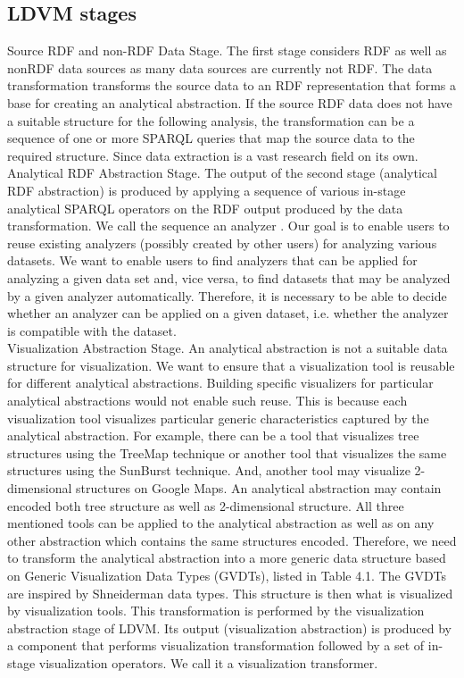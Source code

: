 \documentclass[a4paper,12pt,oneside]{report}
\begin{document}
{{\subsection{LDVM stages}
{Source RDF and non-RDF Data Stage. The first stage considers RDF as well as nonRDF data sources as many data sources are currently not RDF. The data transformation transforms the source data to an RDF representation that forms a base for creating an
analytical abstraction. If the source RDF data does not have a suitable structure for the following analysis, the transformation can be a sequence of one or more SPARQL queries that map the source data to the required structure. Since data extraction is a vast research field on its own.\\
Analytical RDF Abstraction Stage. The output of the second stage (analytical RDF abstraction) is produced by applying a sequence of various in-stage analytical SPARQL
operators on the RDF output produced by the data transformation. We call the sequence an analyzer . Our goal is to enable users to reuse existing analyzers (possibly created by other users) for analyzing various datasets. We want to enable users
to find analyzers that can be applied for analyzing a given data set and, vice versa, to find datasets that may be analyzed by a given analyzer automatically. Therefore, it is necessary to be able to decide whether an analyzer can be applied on a given dataset, i.e. whether the analyzer is compatible with the dataset.\\
Visualization Abstraction Stage. An analytical abstraction is not a suitable data structure for visualization. We want to ensure that a visualization tool is reusable for
different analytical abstractions. Building specific visualizers for particular analytical abstractions would not enable such reuse. This is because each visualization tool visualizes particular generic characteristics captured by the analytical abstraction. For
example, there can be a tool that visualizes tree structures using the TreeMap technique or another tool that visualizes the same structures using the SunBurst technique. And, another tool may visualize 2-dimensional structures on Google Maps. An analytical abstraction may contain encoded both tree structure as well as 2-dimensional structure. All three mentioned tools can be applied to the analytical abstraction as well as on any other abstraction which contains the same structures encoded. Therefore, we
need to transform the analytical abstraction into a more generic data structure based on Generic Visualization Data Types (GVDTs), listed in Table 4.1. The GVDTs are inspired by Shneiderman data types. This structure is then what is visualized by visualization tools. This transformation is performed by the visualization abstraction stage of LDVM. Its output (visualization abstraction) is produced by a component that performs visualization transformation followed by a set of in-stage visualization operators. We call it a visualization transformer.
}}}
\end{document}
